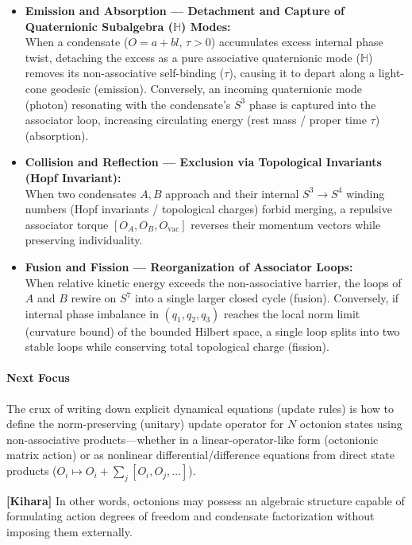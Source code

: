 \documentclass[
  a4paper,
]{article}
\providecommand{\tightlist}{%
  \setlength{\itemsep}{0pt}\setlength{\parskip}{0pt}}
\begin{document}
\begin{itemize}
\tightlist
\item
  \textbf{Emission and Absorption --- Detachment and Capture of
  Quaternionic Subalgebra (\(\mathbb{H}\)) Modes:}\\
  When a condensate (\(O = a + bl\), \(\tau > 0\)) accumulates excess
  internal phase twist, detaching the excess as a pure associative
  quaternionic mode (\(\mathbb{H}\)) removes its non-associative
  self-binding (\(\tau\)), causing it to depart along a light-cone
  geodesic (emission). Conversely, an incoming quaternionic mode
  (photon) resonating with the condensate's \(S^3\) phase is captured
  into the associator loop, increasing circulating energy (rest mass /
  proper time \(\tau\)) (absorption).
\item
  \textbf{Collision and Reflection --- Exclusion via Topological
  Invariants (Hopf Invariant):}\\
  When two condensates \(A, B\) approach and their internal
  \(S^3 \to S^4\) winding numbers (Hopf invariants / topological
  charges) forbid merging, a repulsive associator torque
  \([O_A, O_B, O_{\mathrm{vac}}]\) reverses their momentum vectors while
  preserving individuality.
\item
  \textbf{Fusion and Fission --- Reorganization of Associator Loops:}\\
  When relative kinetic energy exceeds the non-associative barrier, the
  loops of \(A\) and \(B\) rewire on \(S^7\) into a single larger closed
  cycle (fusion). Conversely, if internal phase imbalance in
  \((q_1, q_2, q_3)\) reaches the local norm limit (curvature bound) of
  the bounded Hilbert space, a single loop splits into two stable loops
  while conserving total topological charge (fission).
\end{itemize}

\paragraph{Next Focus}\label{next-focus}

The crux of writing down explicit dynamical equations (update rules) is
how to define the norm-preserving (unitary) update operator for \(N\)
octonion states using non-associative products---whether in a
linear-operator-like form (octonionic matrix action) or as nonlinear
differential/difference equations from direct state products
(\(O_i \mapsto O_i + \sum_j [O_i, O_j, \dots]\)).

\textbf{{[}Kihara{]}} In other words, octonions may possess an algebraic
structure capable of formulating action degrees of freedom and
condensate factorization without imposing them externally.
\end{document}
